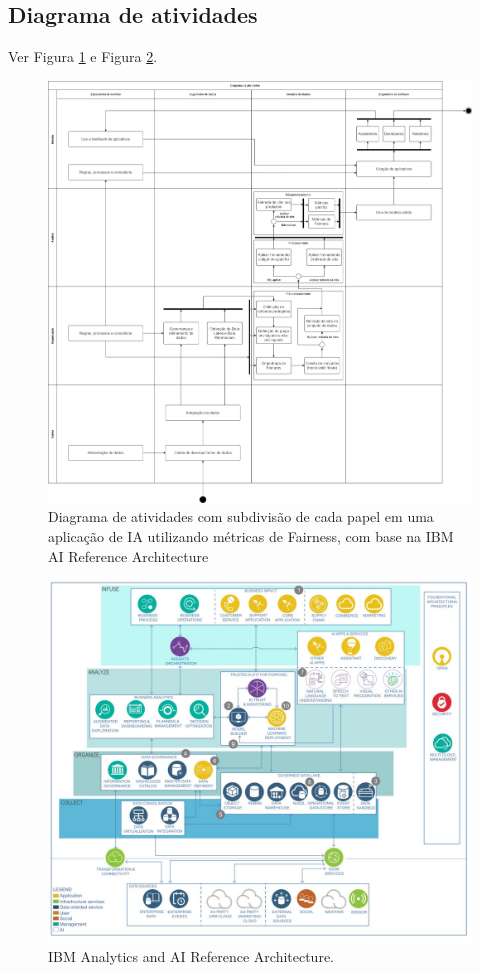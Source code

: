 \documentclass[portugues, 12pt, a4paper]{article}
\begin{document}
\subsection{Diagrama de atividades}

Ver Figura \ref{fig:AIRoles} e Figura \ref{fig:AIReferenceArchitecture}.

\begin{figure}[h]
\centering
\includegraphics[scale=0.25]{images/Diagrama_Atividades_update.jpg}
\caption {Diagrama de atividades com subdivisão de cada papel em uma aplicação de IA utilizando métricas de Fairness, com base na IBM AI Reference Architecture~\citep{IBM_2021}}
\label{fig:AIRoles}
\end{figure}

\begin{figure}[h]
\centering
\includegraphics[scale=0.4]{images/ai-analytics-ref-diagram-analyze.jpg}
\caption {IBM Analytics and AI Reference Architecture.}
\label{fig:AIReferenceArchitecture}
\end{figure}
\end{document}

